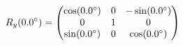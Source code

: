 \documentclass[preview]{standalone}
\begin{document}
\begin{align*}
\special{dvisvgm:raw <g id='unique000'>}R_y(0.0^\circ) = \begin{pmatrix} \cos(0.0^\circ) & 0 & -\sin(0.0^\circ) \\ 0 & 1 & 0 \\ \sin(0.0^\circ) & 0 & \cos(0.0^\circ) \end{pmatrix}\special{dvisvgm:raw </g>}
\end{align*}
\end{document}
